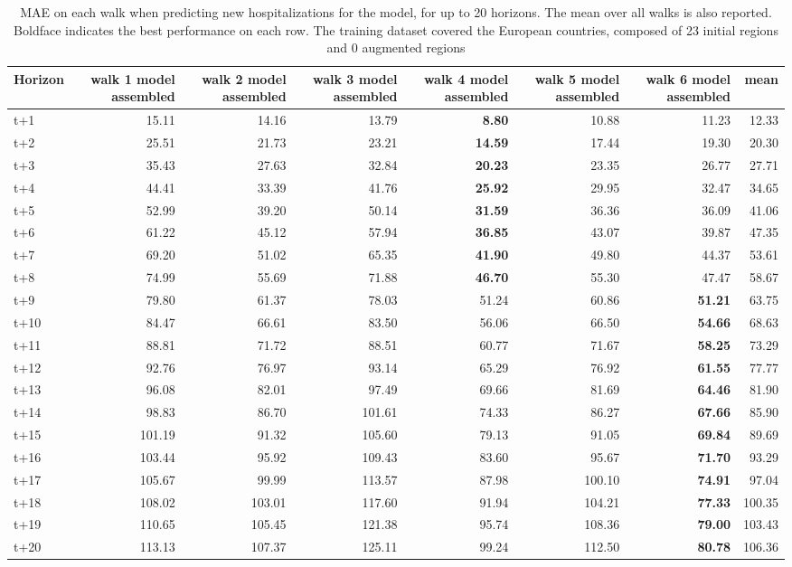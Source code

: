 \begin{table}[H]
\centering
\caption{MAE on each walk when predicting new hospitalizations for the model, for up to 20 horizons. The mean over all walks is also reported. Boldface indicates the best performance on each row. The training dataset covered the European countries, composed of 23 initial regions and 0 augmented regions }
\label{tab:MAE_walk_assembly}
\begin{tabular}{lrrrrrrr}
\toprule
Horizon &  walk 1 model assembled &  walk 2 model assembled &  walk 3 model assembled &  walk 4 model assembled &  walk 5 model assembled &  walk 6 model assembled &   mean \\
\midrule
t+1  & 15.11  & 14.16  & 13.79  & \textbf{8.80}  & 10.88  & 11.23  & 12.33  \\
t+2  & 25.51  & 21.73  & 23.21  & \textbf{14.59}  & 17.44  & 19.30  & 20.30  \\
t+3  & 35.43  & 27.63  & 32.84  & \textbf{20.23}  & 23.35  & 26.77  & 27.71  \\
t+4  & 44.41  & 33.39  & 41.76  & \textbf{25.92}  & 29.95  & 32.47  & 34.65  \\
t+5  & 52.99  & 39.20  & 50.14  & \textbf{31.59}  & 36.36  & 36.09  & 41.06  \\
t+6  & 61.22  & 45.12  & 57.94  & \textbf{36.85}  & 43.07  & 39.87  & 47.35  \\
t+7  & 69.20  & 51.02  & 65.35  & \textbf{41.90}  & 49.80  & 44.37  & 53.61  \\
t+8  & 74.99  & 55.69  & 71.88  & \textbf{46.70}  & 55.30  & 47.47  & 58.67  \\
t+9  & 79.80  & 61.37  & 78.03  & 51.24  & 60.86  & \textbf{51.21}  & 63.75  \\
t+10  & 84.47  & 66.61  & 83.50  & 56.06  & 66.50  & \textbf{54.66}  & 68.63  \\
t+11  & 88.81  & 71.72  & 88.51  & 60.77  & 71.67  & \textbf{58.25}  & 73.29  \\
t+12  & 92.76  & 76.97  & 93.14  & 65.29  & 76.92  & \textbf{61.55}  & 77.77  \\
t+13  & 96.08  & 82.01  & 97.49  & 69.66  & 81.69  & \textbf{64.46}  & 81.90  \\
t+14  & 98.83  & 86.70  & 101.61  & 74.33  & 86.27  & \textbf{67.66}  & 85.90  \\
t+15  & 101.19  & 91.32  & 105.60  & 79.13  & 91.05  & \textbf{69.84}  & 89.69  \\
t+16  & 103.44  & 95.92  & 109.43  & 83.60  & 95.67  & \textbf{71.70}  & 93.29  \\
t+17  & 105.67  & 99.99  & 113.57  & 87.98  & 100.10  & \textbf{74.91}  & 97.04  \\
t+18  & 108.02  & 103.01  & 117.60  & 91.94  & 104.21  & \textbf{77.33}  & 100.35  \\
t+19  & 110.65  & 105.45  & 121.38  & 95.74  & 108.36  & \textbf{79.00}  & 103.43  \\
t+20  & 113.13  & 107.37  & 125.11  & 99.24  & 112.50  & \textbf{80.78}  & 106.36  \\

\bottomrule
\end{tabular}
\end{table}
